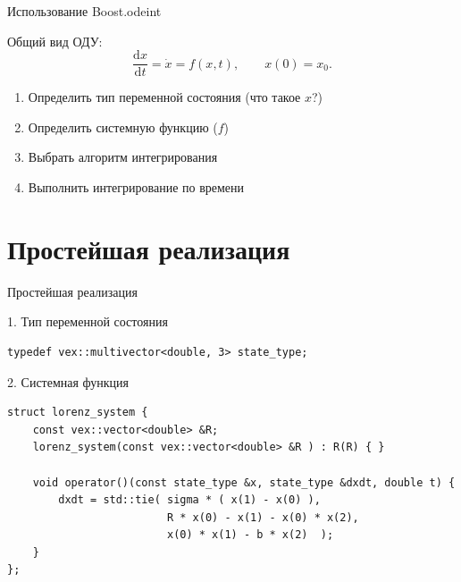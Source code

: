 \documentclass[@BEAMER_OPTIONS@]{beamer}
\begin{document}
\begin{frame}{Использование Boost.odeint}
    \begin{block}{Общий вид ОДУ:}
        \begin{equation*}
            \frac{\mbox{d} x}{\mbox{d} t } = \dot{x} = f(x , t),
            \quad \quad x(0) = x_0.
        \end{equation*}
    \end{block}

    \vspace{\baselineskip}

    \begin{description}[\;]
        \item[Порядок применения Boost.odeint:] \quad
        \begin{enumerate}
            \item Определить тип переменной состояния (что такое $x$?)
            \item Определить системную функцию ($f$)
            \item Выбрать алгоритм интегрирования
            \item Выполнить интегрирование по времени
        \end{enumerate}
    \end{description}
\end{frame}


\section{Простейшая реализация}

\begin{frame}[fragile]{Простейшая реализация}
    \begin{exampleblock}{1. Тип переменной состояния}
        \begin{lstlisting}
typedef vex::multivector<double, 3> state_type;
        \end{lstlisting}
    \end{exampleblock}

    \begin{exampleblock}{2. Системная функция}
        \begin{lstlisting}[firstnumber=last]
struct lorenz_system {
    const vex::vector<double> &R;
    lorenz_system(const vex::vector<double> &R ) : R(R) { }

    void operator()(const state_type &x, state_type &dxdt, double t) {
        dxdt = std::tie( sigma * ( x(1) - x(0) ),
                         R * x(0) - x(1) - x(0) * x(2),
                         x(0) * x(1) - b * x(2)  );
    }
};
        \end{lstlisting}
    \end{exampleblock}
\end{frame}
\end{document}
